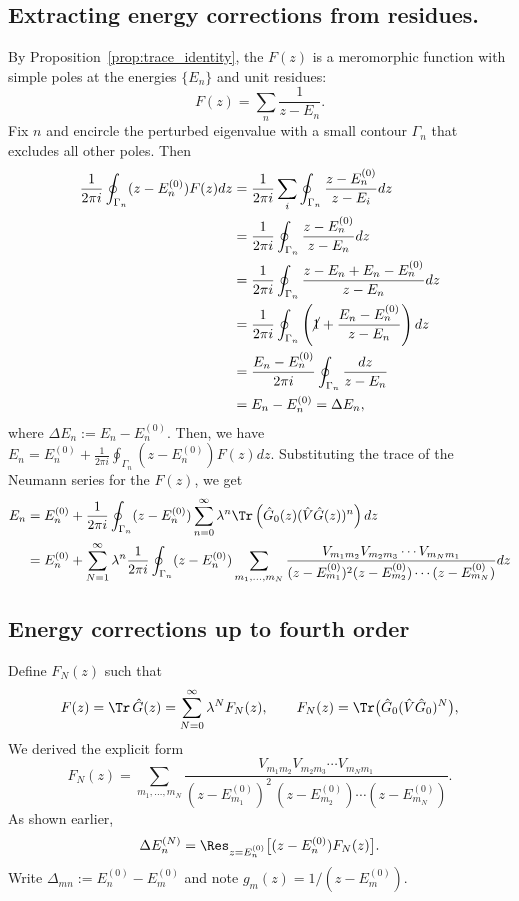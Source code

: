 \subsection{Extracting energy corrections from residues.}
By Proposition~\ref{prop:trace_identity}, the $F(z)$ is a
meromorphic function with simple poles at the energies
$\{E_n\}$ and unit residues:
\[
  F(z)=\sum_n \frac{1}{z-E_n}.
\]
Fix $n$ and encircle the perturbed eigenvalue with a small contour
$\Gamma_n$ that excludes all other poles.
Then
\begin{align}\label{eq:residue_energy_shift_master}
  \frac{1}{2\pi i}\oint_{\Gamma_n} (z-E_n^{(0)})F(z)dz
  &=\frac{1}{2\pi i} \sum _{i} \oint_{\Gamma_n} \frac{z-E_n^{(0)}}{z-E_i}dz \\
  &=\frac{1}{2\pi i} \oint_{\Gamma_n} \frac{z-E_n^{(0)}}{z-E_n}dz \\
  &=\frac{1}{2\pi i} \oint_{\Gamma_n} \frac{z-E_n + E_n - E_n^{(0)}}{z-E_n}dz \\
  &=\frac{1}{2\pi i} \oint_{\Gamma_n} \left(\cancel{1} + \frac{E_n
  -E_n^{(0)}}{z-E_n}\right)dz \\
  &=\frac{E_n-E_n^{(0)}}{2\pi
  i}\oint_{\Gamma_n}\frac{dz}{z-E_n}\\
  &=E_n-E_n^{(0)} = \Delta E_n,
\end{align}
where $\Delta E_n:=E_n-E_n^{(0)}$. Then, we have $E_n = E_n^{(0)} +
\frac{1}{2\pi i}\oint_{\Gamma_n} (z-E_n^{(0)})F(z)dz$.
Substituting the trace of the Neumann series for the $F(z)$, we get
\begin{align}
  E_n &= E_n^{(0)} + \frac{1}{2\pi i}\oint_{\Gamma_n}
  (z-E_n^{(0)})\sum_{n=0}^\infty \lambda^n \Tr \left(\hat
    G_0(z) (\hat V
  \hat G(z)) ^{n}\right)dz \\
  &=  E_n^{(0)} + \sum _{N=1}^{\infty} \lambda^n \frac{1}{2\pi
  i}\oint_{\Gamma_n}
  (z-E_n^{(0)})
  \sum_{m_1,\dots,m_N}
  \frac{V_{m_1 m_2}V_{m_2 m_3}\cdots V_{m_N m_1}}
  {(z-E_{m_1}^{(0)})^2(z-E_{m_2}^{(0)})\cdots (z-E_{m_N}^{(0)})}dz
\end{align}
\subsection{Energy corrections up to fourth order}
Define $F_N (z)$ such that
\begin{equation}
  F(z)=\Tr\,\hat G(z)=\sum_{N=0}^{\infty}\lambda^N F_N(z),
  \qquad
  F_N(z)=\Tr\big(\hat G_0(\hat V\hat G_0)^N\big),
\end{equation}
We derived the explicit form
\begin{equation}
  \label{eq:FN_loop}
  F_N(z)=\sum_{m_1,\dots,m_N}
  \frac{V_{m_1 m_2}V_{m_2 m_3}\cdots V_{m_N m_1}}
  {(z-E_{m_1}^{(0)})^2\,(z-E_{m_2}^{(0)})\cdots(z-E_{m_N}^{(0)})}.
\end{equation}
As shown earlier,
\begin{equation}
  \label{eq:ResidueRule}
  \Delta E_n^{(N)}=\Res_{z=E_n^{(0)}}\big[(z-E_n^{(0)})F_N(z)\big].
\end{equation}
Write $\Delta_{mn}:=E_n^{(0)}-E_m^{(0)}$ and note $g_m(z)=1/(z-E_m^{(0)})$.

